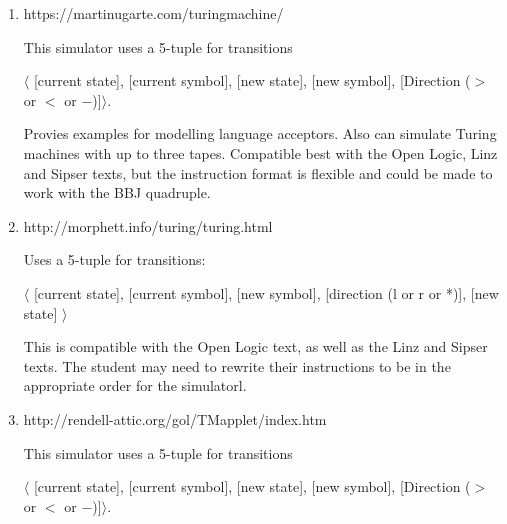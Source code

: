 \documentclass[../../include/open-logic-section]{subfiles}
\begin{document}
\begin{enumerate}
\item https://martinugarte.com/turingmachine/

This simulator uses a 5-tuple for transitions 

$\langle$ [current state], [current symbol], [new state], [new symbol], [Direction ($>$ or $<$ or $-$)]$\rangle$.

 Provies examples for modelling language acceptors. Also can simulate Turing machines with up to three tapes. Compatible best with the Open Logic, Linz and Sipser texts, but the instruction format is flexible and could be made to work with the BBJ quadruple.
\item http://morphett.info/turing/turing.html

Uses a 5-tuple for transitions:

$\langle$ [current state], [current symbol], [new symbol], [direction (l or r or *)], [new state] $\rangle$

This is compatible with the Open Logic text, as well as the Linz and Sipser texts. The student may need to rewrite their instructions to be in the appropriate order for the simulatorl.

\item http://rendell-attic.org/gol/TMapplet/index.htm

This simulator uses a 5-tuple for transitions 

$\langle$ [current state], [current symbol], [new state], [new symbol], [Direction ($>$ or $<$ or $-$)]$\rangle$.

\end{enumerate}
\end{document}
